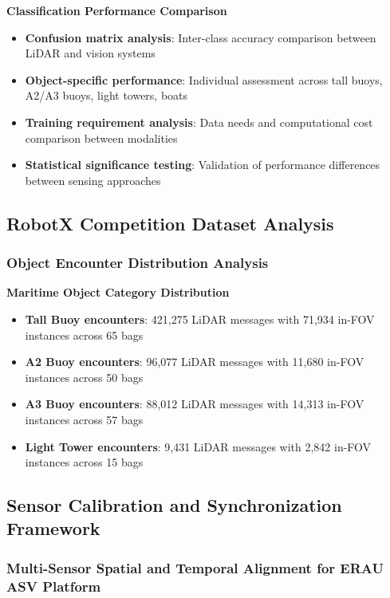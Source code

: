 \documentclass{erauthesis}
\begin{document}
\textbf{Classification Performance Comparison}
\begin{itemize}
\item \textbf{Confusion matrix analysis}: Inter-class accuracy comparison between LiDAR and vision systems
\item \textbf{Object-specific performance}: Individual assessment across tall buoys, A2/A3 buoys, light towers, boats
\item \textbf{Training requirement analysis}: Data needs and computational cost comparison between modalities
\item \textbf{Statistical significance testing}: Validation of performance differences between sensing approaches
\end{itemize}

\subsection{RobotX Competition Dataset Analysis}

\subsubsection{Object Encounter Distribution Analysis}

\textbf{Maritime Object Category Distribution}
\begin{itemize}
\item \textbf{Tall Buoy encounters}: 421,275 LiDAR messages with 71,934 in-FOV instances across 65 bags
\item \textbf{A2 Buoy encounters}: 96,077 LiDAR messages with 11,680 in-FOV instances across 50 bags
\item \textbf{A3 Buoy encounters}: 88,012 LiDAR messages with 14,313 in-FOV instances across 57 bags
\item \textbf{Light Tower encounters}: 9,431 LiDAR messages with 2,842 in-FOV instances across 15 bags
\end{itemize}

\subsection{Sensor Calibration and Synchronization Framework}

\subsubsection{Multi-Sensor Spatial and Temporal Alignment for ERAU ASV Platform}
\end{document}
